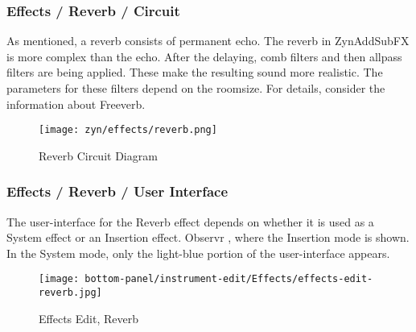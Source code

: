 \subsubsection{Effects / Reverb / Circuit}
\label{subsubsec:effects_edit_reverb_circuit}

   As mentioned, a reverb consists of permanent echo. The reverb in
   ZynAddSubFX is more complex than the echo. After the delaying, comb
   filters and then allpass filters are being applied. These make the
   resulting sound more realistic. The parameters for these filters depend on
   the roomsize. For details, consider the information about Freeverb.

\begin{figure}[H]
   \centering 
   \texttt{[image: zyn/effects/reverb.png]}
   \caption{Reverb Circuit Diagram}
   \label{fig:reverb_circuit_diagram}
\end{figure}

\subsubsection{Effects / Reverb / User Interface}
\label{subsubsec:effects_edit_reverb_ui}

   The user-interface for the Reverb effect depends on whether it is used as a
   System effect or an Insertion effect.
   Observr , where
   the Insertion mode is shown.  In the System mode, only the light-blue
   portion of the user-interface appears.

\begin{figure}[H]
   \centering 
   \texttt{[image: bottom-panel/instrument-edit/Effects/effects-edit-reverb.jpg]}
   \caption{Effects Edit, Reverb}
   \label{fig:effects_edit_reverb}
\end{figure}

